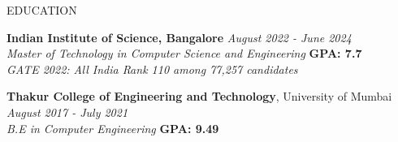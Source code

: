 \documentclass{resume} %
\begin{document}
\begin{rSection}{EDUCATION} 

{\bf Indian Institute of Science, Bangalore} \hfill {\textit{August 2022 - June 2024}}\\
\emph{Master of Technology in Computer Science and Engineering} \hfill {\bf GPA: 7.7}
\\ \emph{GATE 2022: All India Rank 110 among 77,257 candidates}
\vspace{0.15cm}

{\bf Thakur College of Engineering and Technology}, University of Mumbai \hfill {\emph{August 2017 - July 2021}}\\
\emph{B.E in Computer Engineering} \hfill {\bf GPA: 9.49}

\end{rSection}
\end{document}
